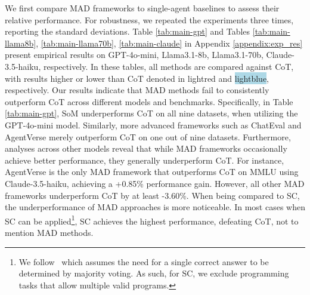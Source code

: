  We first compare MAD frameworks to single-agent baselines to assess their relative performance. For robustness, we repeated the experiments three times, reporting the standard deviations. Table \ref{tab:main-gpt} and Tables \ref{tab:main-llama8b}, \ref{tab:main-llama70b}, \ref{tab:main-claude} in Appendix \ref{appendix:exp_res} present empirical results on GPT-4o-mini, Llama3.1-8b, Llama3.1-70b, Claude-3.5-haiku, respectively.
In these tables, all methods are compared against CoT, with results higher or lower than CoT denoted in \colorbox{LightRed}{lightred} and \colorbox{LightBlue}{lightblue}, respectively. Our results indicate that MAD methods fail to consistently outperform CoT across different models and benchmarks. Specifically, in Table \ref{tab:main-gpt}, SoM underperforms CoT on all nine datasets, when utilizing the GPT-4o-mini model. Similarly, more advanced frameworks such as ChatEval and AgentVerse merely outperform CoT on one out of nine datasets. Furthermore, analyses across other models reveal that while MAD frameworks occasionally achieve better performance, they generally underperform CoT. For instance, AgentVerse is the only MAD framework that outperforms CoT on MMLU using Claude-3.5-haiku, achieving a +0.85\% performance gain. However, all other MAD frameworks underperform CoT by at least -3.60\%. 
When being compared to SC, the underperformance of MAD approaches is more noticeable. %
In most cases when SC can be applied\footnote{We follow~\citep{wang2022self} which assumes the need for a single correct answer to be determined by majority voting. As such, for SC, we exclude programming tasks that allow multiple valid programs.}, SC achieves the highest performance, defeating CoT, not to mention MAD methods.

